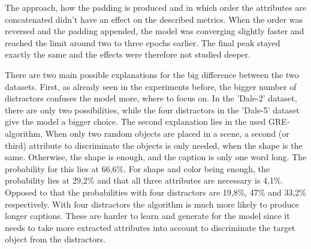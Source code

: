 The approach, how the padding is produced and in which order the attributes are concatenated didn't have an effect on the described metrics.
When the order was reversed and the padding appended, the model was converging slightly faster and reached the limit around two to three epochs earlier.
The final peak stayed exactly the same and the effects were therefore not studied deeper.

There are two main possible explanations for the big difference between the two datasets.
First, as already seen in the experiments before, the bigger number of distractors confuses the model more, where to focus on.
In the 'Dale-2' dataset, there are only two possibilities, while the four distractors in the 'Dale-5' dataset give the model a bigger choice.
The second explanation lies in the used GRE-algorithm.
When only two random objects are placed in a scene, a second (or third) attribute to discriminate the objects is only needed, when the shape is the same.
Otherwise, the shape is enough, and the caption is only one word long.
The probability for this lies at 66,6\%.
For shape and color being enough, the probability lies at 29,2\% and that all three attributes are necessary is 4,1\%.
Opposed to that the probabilities with four distractors are 19,8\%, 47\% and 33,2\% respectively.
With four distractors the algorithm is much more likely to produce longer captions.
These are harder to learn and generate for the model since it needs to take more extracted attributes into account to discriminate the target object from the distractors.
